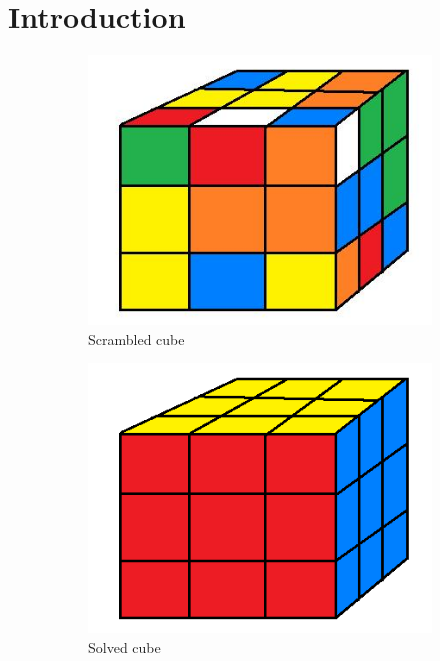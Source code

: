 \documentclass[a4paper,11pt]{kth-mag}
\begin{document}
\pagestyle{newchap}
\chapter{Introduction}
\begin{figure}
	\centering
	\begin{subfigure}[b]{0.3\textwidth}
		\includegraphics[width=\textwidth]{figs/scramble.jpg}
		\caption{Scrambled cube}
		\label{fig_1}
	\end{subfigure}
	\begin{subfigure}[b]{0.3\textwidth}
		\includegraphics[width=\textwidth]{figs/DONE.png}
		\caption{Solved cube}
		\label{fig_2}
	\end{subfigure}
	\caption{}
\end{figure}
\end{document}
